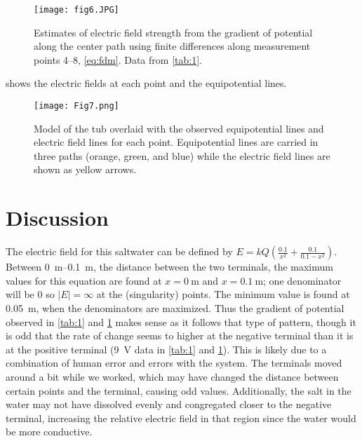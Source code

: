 ﻿\documentclass[10pt,journal,twoside]{IEEEtran}
\begin{document}
\begin{figure}
\begin{center}
\texttt{[image: fig6.JPG]}
\end{center}
\caption{Estimates of electric field strength from the gradient of potential along the center path using finite differences along measurement points 4--8, \cref{eq:fdm}. Data from \cref{tab:1}.}
\label{fig:6}
\end{figure}


 shows the electric fields at each point and the equipotential lines. 
\begin{figure}
\begin{center}
\texttt{[image: Fig7.png]}
\end{center}
\caption{Model of the tub overlaid with the observed equipotential lines and electric field lines for each point. Equipotential lines are carried in three paths (orange, green, and blue) while the electric field lines are shown as yellow arrows.}
\label{fig:7}
\end{figure}








\section{Discussion}
The electric field for this saltwater can be defined by $E=kQ(\frac{0.1}{x^2}+\frac{0.1}{0.1-x^2})$. Between \qtyrange{0}{0.1}{\meter}, the distance between the two terminals, the maximum values for this equation are found at $x=\qty{0}{\meter}$ and $x = \qty{0.1}{\meter}$; one denominator will be 0 so $|E| = \infty$ at the (singularity) points. The minimum value is found at \qty{0.05}{\meter}, when the denominators are maximized. Thus the gradient of potential observed in \cref{tab:1} and \cref{fig:6} makes sense as it follows that type of pattern, though it is odd that the rate of change seems to higher at the negative terminal than it is at the positive terminal (\qty{9}{\volt} data in \cref{tab:1} and \cref{fig:6}). This is likely due to a combination of human error and errors with the system. The terminals moved around a bit while we worked, which may have changed the distance between certain points and the terminal, causing odd values. Additionally, the salt in the water may not have dissolved evenly and congregated closer to the negative terminal, increasing the relative electric field in that region since the water would be more conductive.
\end{document}

